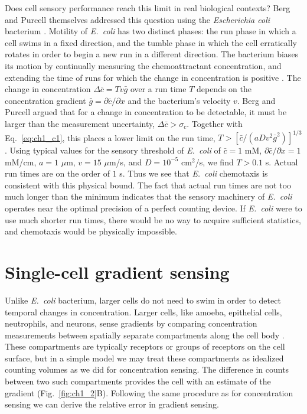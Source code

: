 Does cell sensory performance reach this limit in real biological contexts? Berg and Purcell themselves addressed this question using the \textit{Escherichia coli} bacterium \cite{berg1977physics}. Motility of \textit{E.\ coli} has two distinct phases: the run phase in which a cell swims in a fixed direction, and the tumble phase in which the cell erratically rotates in order to begin a new run in a different direction. The bacterium biases its motion by continually measuring the chemoattractant concentration, and extending the time of runs for which the change in concentration is positive \cite{berg1977physics,dahlquist1976studies}. The change in concentration $\Delta \bar{c} = Tv\bar{g}$
over a run time $T$ depends on the concentration gradient
$\bar{g} = \partial \bar{c} / \partial x$
and the bacterium's velocity $v$. Berg and Purcell argued that for a change in concentration to be detectable, it must be larger than the measurement uncertainty,
$\Delta \bar{c} > \sigma_c $.
Together with Eq.\ \ref{eq:ch1_c1}, this places a lower limit on the run time,
$T > [ \bar{c}/(aDv^2\bar{g}^2)]^{1/3}$.
Using typical values \cite{berg1977physics} for the sensory threshold of \textit{E.\ coli} of
$\bar{c} = 1$ mM, $\partial \bar{c} / \partial x = 1$ mM/cm, $a=1$ $\mu$m, $v=15$ $\mu$m/s, and $D=10^{-5}$ cm$^2$/s, we find $T > 0.1$ s.
Actual run times are on the order of $1$ s. Thus we see that \textit{E.\ coli} chemotaxis is consistent with this physical bound. The fact that actual run times are not too much longer than the minimum indicates that the sensory machinery of \textit{E.\ coli} operates near the optimal precision of a perfect counting device. If \textit{E.\ coli} were to use much shorter run times, there would be no way to acquire sufficient statistics, and chemotaxis would be physically impossible.

\section{Single-cell gradient sensing}

Unlike \textit{E.\ coli} bacterium, larger cells do not need to swim in order to detect temporal changes in concentration. Larger cells, like amoeba, epithelial cells, neutrophils, and neurons, sense gradients by comparing concentration measurements between spatially separate compartments along the cell body \cite{jilkine2011comparison}. These compartments are typically receptors or groups of receptors on the cell surface, but in a simple model we may treat these compartments as idealized counting volumes as we did for concentration sensing. The difference in counts between two such compartments provides the cell with an estimate of the gradient (Fig.\ \ref{fig:ch1_2}B). Following the same procedure as for concentration sensing we can derive the relative error in gradient sensing.

